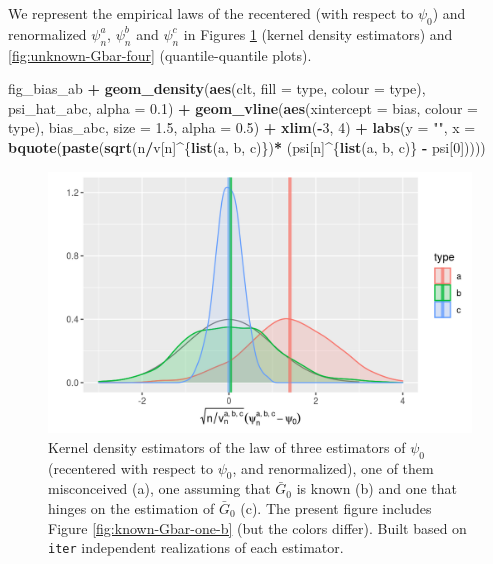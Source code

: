 \documentclass[11pt,openright,twoside]{book}
\newenvironment{Shaded}{\begin{snugshade}}{\end{snugshade}}
\newcommand{\DataTypeTok}[1]{\textcolor[rgb]{0.13,0.29,0.53}{#1}}
\newcommand{\DecValTok}[1]{\textcolor[rgb]{0.00,0.00,0.81}{#1}}
\newcommand{\FloatTok}[1]{\textcolor[rgb]{0.00,0.00,0.81}{#1}}
\newcommand{\KeywordTok}[1]{\textcolor[rgb]{0.13,0.29,0.53}{\textbf{#1}}}
\newcommand{\NormalTok}[1]{#1}
\newcommand{\OperatorTok}[1]{\textcolor[rgb]{0.81,0.36,0.00}{\textbf{#1}}}
\newcommand{\StringTok}[1]{\textcolor[rgb]{0.31,0.60,0.02}{#1}}
\newcommand{\Gbar}{\bar{G}}
\theoremstyle{definition}
\theoremstyle{definition}
\theoremstyle{definition}
\theoremstyle{remark}
\begin{document}
We represent the empirical laws of the recentered (with respect to \(\psi_{0}\))
and renormalized \(\psi_{n}^{a}\), \(\psi_{n}^{b}\) and \(\psi_{n}^{c}\) in Figures
\ref{fig:unknown-Gbar-three} (kernel density estimators) and
\ref{fig:unknown-Gbar-four} (quantile-quantile plots).



\begin{Shaded}
\begin{Highlighting}[]
\NormalTok{fig_bias_ab }\OperatorTok{+}
\StringTok{  }\KeywordTok{geom_density}\NormalTok{(}\KeywordTok{aes}\NormalTok{(clt, }\DataTypeTok{fill =}\NormalTok{ type, }\DataTypeTok{colour =}\NormalTok{ type), psi_hat_abc, }\DataTypeTok{alpha =} \FloatTok{0.1}\NormalTok{) }\OperatorTok{+}
\StringTok{  }\KeywordTok{geom_vline}\NormalTok{(}\KeywordTok{aes}\NormalTok{(}\DataTypeTok{xintercept =}\NormalTok{ bias, }\DataTypeTok{colour =}\NormalTok{ type),}
\NormalTok{             bias_abc, }\DataTypeTok{size =} \FloatTok{1.5}\NormalTok{, }\DataTypeTok{alpha =} \FloatTok{0.5}\NormalTok{) }\OperatorTok{+}
\StringTok{  }\KeywordTok{xlim}\NormalTok{(}\OperatorTok{-}\DecValTok{3}\NormalTok{, }\DecValTok{4}\NormalTok{) }\OperatorTok{+}\StringTok{ }
\StringTok{  }\KeywordTok{labs}\NormalTok{(}\DataTypeTok{y =} \StringTok{""}\NormalTok{,}
       \DataTypeTok{x =} \KeywordTok{bquote}\NormalTok{(}\KeywordTok{paste}\NormalTok{(}\KeywordTok{sqrt}\NormalTok{(n}\OperatorTok{/}\NormalTok{v[n]}\OperatorTok{^}\NormalTok{\{}\KeywordTok{list}\NormalTok{(a, b, c)\})}\OperatorTok{*}
\StringTok{                        }\NormalTok{(psi[n]}\OperatorTok{^}\NormalTok{\{}\KeywordTok{list}\NormalTok{(a, b, c)\} }\OperatorTok{-}\StringTok{ }\NormalTok{psi[}\DecValTok{0}\NormalTok{]))))}
\end{Highlighting}
\end{Shaded}

\begin{figure}

{\centering \includegraphics[width=0.7\linewidth]{img/unknown-Gbar-three-1} 

}

\caption{Kernel density estimators of the law of three estimators of \(\psi_{0}\) (recentered with respect to \(\psi_{0}\), and renormalized), one of them misconceived (a), one assuming that \(\Gbar_{0}\) is known (b) and one that hinges on the estimation of \(\Gbar_{0}\) (c). The present figure includes Figure \ref{fig:known-Gbar-one-b} (but the colors differ). Built based on \texttt{iter} independent realizations of each estimator.}\label{fig:unknown-Gbar-three}
\end{figure}
\end{document}
